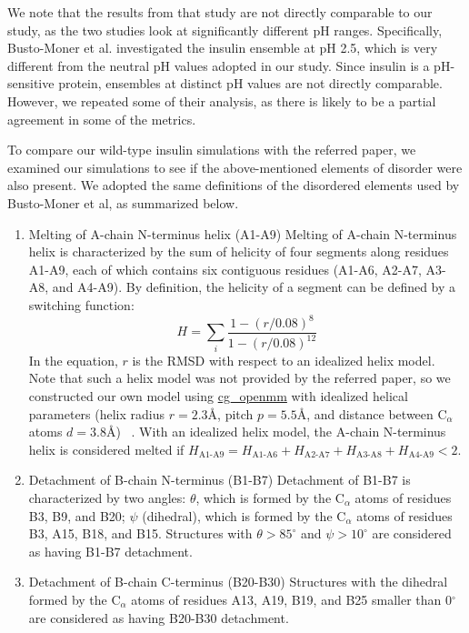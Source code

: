 \documentclass[sn-vancouver]{sn-jnl}
\begin{document}
We note that the results from that study are not directly comparable to our study, as the two studies look at significantly different pH ranges. Specifically, Busto-Moner et al. investigated the insulin ensemble at pH 2.5, which is very different from the neutral pH values adopted in our study. Since insulin is a pH-sensitive protein, ensembles at distinct pH values are not directly comparable. However, we repeated some of their analysis, as there is likely to be a partial agreement in some of the metrics. 

To compare our wild-type insulin simulations with the referred paper, we examined our simulations to see if the above-mentioned elements of disorder were also present. We adopted the same definitions of the disordered elements used by Busto-Moner et al, as summarized below. 
\begin{enumerate}
\item Melting of A-chain N-terminus helix (A1-A9)
\newline
Melting of A-chain N-terminus helix is characterized by the sum of helicity of four segments along residues A1-A9, each of which contains six contiguous residues (A1-A6, A2-A7, A3-A8, and A4-A9). By definition, the helicity of a segment can be defined by a switching function:
\begin{equation}
    H = \sum_{i} \frac{1-(r/0.08)^8}{1-(r/0.08)^{12}}
\end{equation}
In the equation, $r$ is the RMSD with respect to an idealized helix model. Note that such a helix model was not provided by the referred paper, so we constructed our own model using \href{https://github.com/shirtsgroup/cg_openmm}{cg\_openmm} with idealized helical parameters (helix radius $r=2.3$\AA, pitch $p=5.5$\AA, and distance between C$_\alpha$ atoms $d=3.8$\AA) ~\cite{guo2013description, tozzini2010minimalist}. With an idealized helix model, the A-chain N-terminus helix is considered melted if $H_{\text{A1-A9}}=H_{\text{A1-A6}}+H_{\text{A2-A7}}+H_{\text{A3-A8}}+H_{\text{A4-A9}}<2$.

\item Detachment of B-chain N-terminus (B1-B7)
\newline
Detachment of B1-B7 is characterized by two angles: $\theta$, which is formed by the C$_\alpha$ atoms of residues B3, B9, and B20; $\psi$ (dihedral), which is formed by the C$_\alpha$ atoms of residues B3, A15, B18, and B15. Structures with $\theta>85^{\circ}$ and $\psi>10^{\circ}$ are considered as having B1-B7 detachment.

\item Detachment of B-chain C-terminus (B20-B30)
\newline
Structures with the dihedral formed by the C$_\alpha$ atoms of residues A13, A19, B19, and B25 smaller than 0$^{\circ}$ are considered as having B20-B30 detachment.
\end{enumerate}
\end{document}
